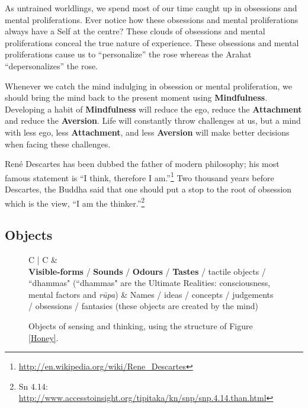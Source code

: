 As untrained worldlings, we spend most of our time caught up in obsessions and mental proliferations. Ever notice how these obsessions and mental proliferations always have a Self at the centre? These clouds of obsessions and mental proliferations conceal the true nature of experience. These obsessions and mental proliferations cause us to “personalize” the rose whereas the Arahat “depersonalizes” the rose.

Whenever we catch the mind indulging in obsession or mental proliferation, we should bring the mind back to the present moment using \textbf{Mindfulness}. Developing a habit of \textbf{Mindfulness} will reduce the ego, reduce the \textbf{Attachment} and reduce the \textbf{Aversion}. Life will constantly throw challenges at us, but a mind with less ego, less \textbf{Attachment}, and less \textbf{Aversion} will make better decisions when facing these challenges.

René Descartes has been dubbed the father of modern philosophy; his most famous statement is “I think, therefore I am.”\footnote{\url{http://en.wikipedia.org/wiki/Rene_Descartes}} Two thousand years before Descartes, the Buddha said that one should put a stop to the root of obsession which is the view, “I am the thinker.”\footnote{Sn 4.14: \url{http://www.accesstoinsight.org/tipitaka/kn/snp/snp.4.14.than.html}}

\subsection*{Objects}

\begin{figure}[H]
\begin{tabular*}{\textwidth}{C{\tabcolsep} | C{\tabcolsep}}
\toprule
{} &  \\
\midrule
\textbf{Visible-forms} / \textbf{Sounds} / \textbf{Odours} / \textbf{Tastes} / tactile objects / ``dhammas"\newline
 (``dhammas" are the Ultimate Realities: consciousness, mental factors and \textit{rūpa})
 &
 Names / ideas / concepts / judgements / obsessions / fantasies\newline
 (these objects are created by the mind)
 \\
 
\bottomrule
\end{tabular*}
\caption{Objects of sensing and thinking, using the structure of Figure \ref{Honey}.}
\label{objects}
\end{figure}

